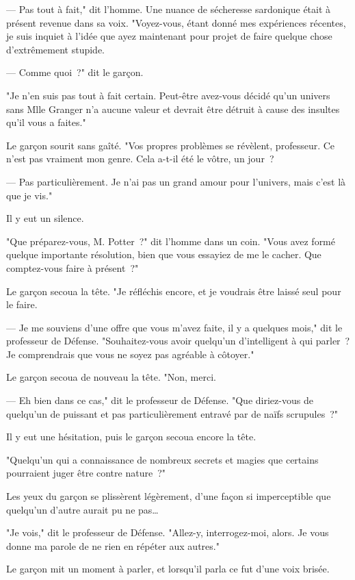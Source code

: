 --- Pas tout à fait," dit l'homme. Une nuance de sécheresse sardonique était à présent revenue dans sa voix. "Voyez-vous, étant donné mes expériences récentes, je suis inquiet à l'idée que ayez maintenant pour projet de faire quelque chose d'extrêmement stupide.

--- Comme quoi~?" dit le garçon.

"Je n'en suis pas tout à fait certain. Peut-être avez-vous décidé qu'un univers sans Mlle Granger n'a aucune valeur et devrait être détruit à cause des insultes qu'il vous a faites."

Le garçon sourit sans gaîté. "Vos propres problèmes se révèlent, professeur. Ce n'est pas vraiment mon genre. Cela a-t-il été le vôtre, un jour~?

--- Pas particulièrement. Je n'ai pas un grand amour pour l'univers, mais c'est là que je vis."

Il y eut un silence.

"Que préparez-vous, M. Potter~?" dit l'homme dans un coin. "Vous avez formé quelque importante résolution, bien que vous essayiez de me le cacher. Que comptez-vous faire à présent~?"

Le garçon secoua la tête. "Je réfléchis encore, et je voudrais être laissé seul pour le faire.

--- Je me souviens d'une offre que vous m'avez faite, il y a quelques mois," dit le professeur de Défense. "Souhaitez-vous avoir quelqu'un d'intelligent à qui parler~? Je comprendrais que vous ne soyez pas agréable à côtoyer."

Le garçon secoua de nouveau la tête. "Non, merci.

--- Eh bien dans ce cas," dit le professeur de Défense. "Que diriez-vous de quelqu'un de puissant et pas particulièrement entravé par de naïfs scrupules~?"

Il y eut une hésitation, puis le garçon secoua encore la tête.

"Quelqu'un qui a connaissance de nombreux secrets et magies que certains pourraient juger être contre nature~?"

Les yeux du garçon se plissèrent légèrement, d'une façon si imperceptible que quelqu'un d'autre aurait pu ne pas…

"Je vois," dit le professeur de Défense. "Allez-y, interrogez-moi, alors. Je vous donne ma parole de ne rien en répéter aux autres."

Le garçon mit un moment à parler, et lorsqu'il parla ce fut d'une voix brisée.

